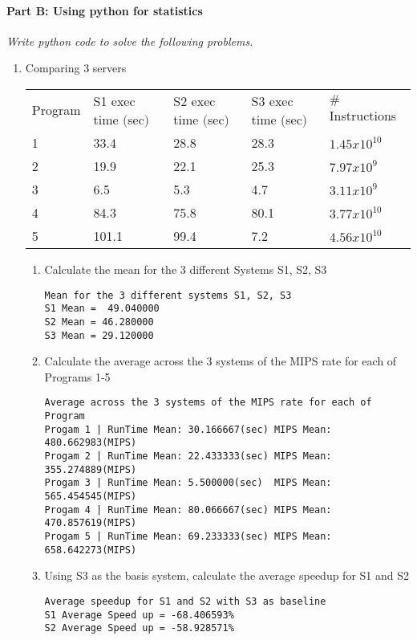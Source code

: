 \documentclass[11pt]{article}
\begin{document}
\paragraph{Part B: Using python for statistics} 
\textit{Write python code to solve the following problems.}
\begin{enumerate}[(1)]

\item Comparing 3 servers
\begin{table}[H]
\begin{tabular}{ l  l  l  l  l }
Program  & S1 exec time $($sec$)$ &  S2 exec time $($sec$)$        &      S3 exec time $($sec$)$   &   $\#$ Instructions     \\
1 & 33.4 & 28.8 & 28.3 & $1.45x10^{10}$ \\
2 &19.9&22.1 &25.3 &$7.97x10^{9}$\\
3 &6.5&5.3&4.7&$3.11x10^{9}$\\
4 &84.3&75.8&80.1&$3.77x10^{10}$\\
5 &101.1&99.4&7.2& $4.56x10^{10}$\\
\end{tabular}
\end{table}

\begin{enumerate}[a]
\item Calculate the mean for the 3 different Systems S1, S2, S3\\
\begin{verbatim}
Mean for the 3 different systems S1, S2, S3
S1 Mean =  49.040000
S2 Mean = 46.280000
S3 Mean = 29.120000

\end{verbatim}

\item Calculate the average across the 3 systems of the MIPS rate for each of Programs 1-5 \\
\begin{verbatim}
Average across the 3 systems of the MIPS rate for each of Program
Progam 1 | RunTime Mean: 30.166667(sec)	MIPS Mean: 480.662983(MIPS)
Progam 2 | RunTime Mean: 22.433333(sec)	MIPS Mean: 355.274889(MIPS)
Progam 3 | RunTime Mean: 5.500000(sec)	MIPS Mean: 565.454545(MIPS)
Progam 4 | RunTime Mean: 80.066667(sec)	MIPS Mean: 470.857619(MIPS)
Progam 5 | RunTime Mean: 69.233333(sec)	MIPS Mean: 658.642273(MIPS)

\end{verbatim}
\item Using S3 as the basis system, calculate the average speedup for S1 and S2\\
\begin{verbatim}
Average speedup for S1 and S2 with S3 as baseline
S1 Average Speed up = -68.406593%
S2 Average Speed up = -58.928571%


\end{verbatim}
\end{enumerate}
\end{enumerate}
\end{document}
